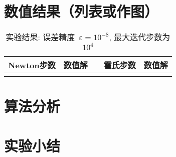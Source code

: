\documentclass[UTF8]{ctexart}
\begin{document}
\section{数值结果（列表或作图）}
\begin{table}[H]
\centering
\caption{实验结果: 误差精度~$\varepsilon = 10^{-8}$, 最大迭代步数为$10^4$}\begin{tabular}{ccccc}
\hline
Newton步数 & 数值解 & \color{blue}{初始点} & 霍氏步数 & 数值解 \\
\hline
\\
\hline
\end{tabular}
\label{tab:tab1}
\end{table}


\section{算法分析}


\section{实验小结}
\end{document}

